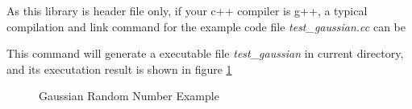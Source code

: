 As this library is header file only,
if your c++ compiler is g++, a typical compilation and link command for the example code file \textit{test\_gaussian.cc} can be

\begin{center}
\end{center}

This command will generate a executable file \textit{test\_gaussian} in current directory, 
and its executation result is shown in figure \ref{fig:gaussian}

\begin{figure}
\centering
{}
\caption{Gaussian Random Number Example}
\label{fig:gaussian}
\end{figure}









